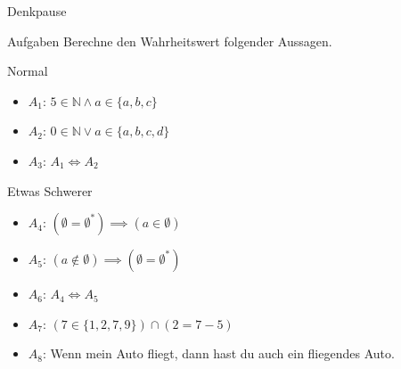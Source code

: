 {
\begin{frame}[fragile]{Denkpause}
    \begin{alertblock}{Aufgaben}
      Berechne den Wahrheitswert folgender Aussagen.
    \end{alertblock}
    \begin{block}{Normal}
    \begin{itemize}
        \item $A_1$: $5 \in \mathbb{N} \wedge a \in \{a, b, c\}$
        \item $A_2$: $0 \in \mathbb{N} \vee a \in \{a, b, c, d\}$
        \item $A_3$: $A_1 \iff A_2$
    \end{itemize}
    \end{block}
    \begin{block}{Etwas Schwerer}
    \begin{itemize}
        \item $A_4$: $(\emptyset=\emptyset^{*}) \implies (a \in \emptyset)$
        \item $A_5$: $(a \notin \emptyset) \implies (\emptyset = \emptyset^{*})$
        \item $A_6$: $A_4 \iff A_5$
        \item $A_7$: $(7 \in \{1, 2, 7, 9\}) \cap (2 = 7-5)$
        \item $A_8$: Wenn mein Auto fliegt, dann hast du auch ein fliegendes Auto.
    \end{itemize}
    \end{block}
\end{frame}
}


